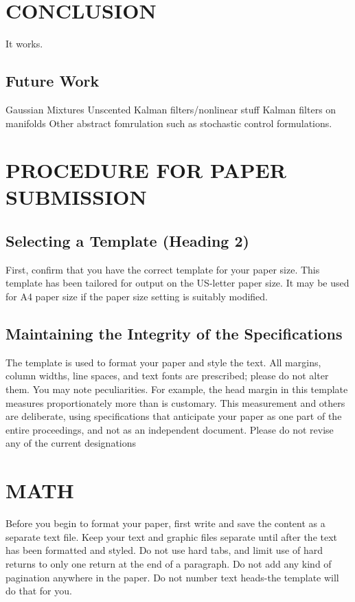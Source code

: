 \documentclass[letterpaper, 10 pt, conference]{ieeeconf}  %
\begin{document}
\section{CONCLUSION}
It works.

\subsection{Future Work}
Gaussian Mixtures
Unscented Kalman filters/nonlinear stuff
Kalman filters on manifolds
Other abstract fomrulation such as stochastic control formulations.


\section{PROCEDURE FOR PAPER SUBMISSION}

\subsection{Selecting a Template (Heading 2)}

First, confirm that you have the correct template for your paper size. This template has been tailored for output on the US-letter paper size. 
It may be used for A4 paper size if the paper size setting is suitably modified.

\subsection{Maintaining the Integrity of the Specifications}

The template is used to format your paper and style the text. All margins, column widths, line spaces, and text fonts are prescribed; please do not alter them. You may note peculiarities. For example, the head margin in this template measures proportionately more than is customary. This measurement and others are deliberate, using specifications that anticipate your paper as one part of the entire proceedings, and not as an independent document. Please do not revise any of the current designations

\section{MATH}

Before you begin to format your paper, first write and save the content as a separate text file. Keep your text and graphic files separate until after the text has been formatted and styled. Do not use hard tabs, and limit use of hard returns to only one return at the end of a paragraph. Do not add any kind of pagination anywhere in the paper. Do not number text heads-the template will do that for you.
\end{document}
